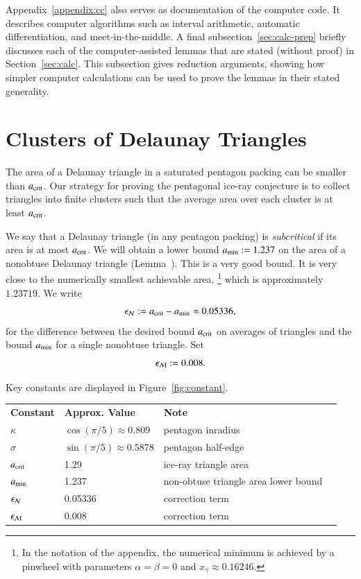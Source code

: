 Appendix~\ref{appendix:cc} also serves as documentation of
the computer code.  It describes computer algorithms such as interval
arithmetic, automatic differentiation, and meet-in-the-middle.  A
final subsection~\ref{sec:calc-prep} briefly discusses each of the
computer-assisted lemmas that are stated (without proof) in
Section~\ref{sec:calc}.  This subsection gives reduction arguments,
showing how simpler computer calculations can be used to prove the
lemmas in their stated generality.  






\section{Clusters of Delaunay Triangles}\label{sec:cluster}

The area of a Delaunay triangle in a saturated pentagon packing can be
smaller than $a_\text{crit}$.  Our strategy for proving the pentagonal
ice-ray conjecture is to collect triangles into finite clusters such
that the average area over each cluster is at least $a_\text{crit}$.

We say that a Delaunay triangle (in any pentagon packing) is {\it
  subcritical} if its area is at most $a_\text{crit}$.  We will obtain a
lower bound $a_\text{min} := 1.237$ on the area of a nonobtuse Delaunay
triangle (Lemma~).  This is a very good bound.  It is
very close to the numerically smallest achievable area,%
\footnote{In the notation of the appendix, the
  numerical minimum is achieved by a pinwheel with parameters
  $\alpha=\beta=0$ and $x_\gamma\approx 0.16246$.}
%
 which is
approximately $1.23719$.  We write 
\begin{equation}\label{eqn:epsN}
\epsilon_{\mathcal N} :=
a_\text{crit} - a_\text{min} \approx 0.05336,
\end{equation} for the difference between the desired
bound $a_\text{crit}$ on averages of triangles and the bound $a_\text{min}$ for a
single nonobtuse triangle.  Set
\begin{equation}\label{eqn:epsM}
\epsilon_{\mathcal M} := 0.008.
\end{equation}

Key constants are displayed in Figure~\ref{fig:constant}.
\bigskip
{}%
{
\begin{tabular}{llll}
{\bf Constant} & {\bf Approx. Value} & {\bf Note} \\
$\kappa$ & $\cos(\pi/5)\approx 0.809$ & pentagon inradius \\
$\sigma$ &$\sin(\pi/5)\approx 0.5878$ & pentagon half-edge \\
$a_\text{crit}$ &1.29 & ice-ray triangle area\\
$a_\text{min}$ & 1.237 & non-obtuse triangle area lower bound\\
$\epsilon_{\mathcal N}$ & 0.05336 & correction term\\
$\epsilon_{\mathcal M}$ & 0.008 & correction term\\
\end{tabular}
}


